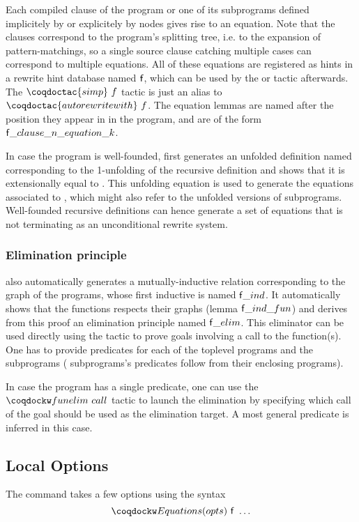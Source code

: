 Each compiled clause of the program or one
of its subprograms defined implicitely by  or explicitely by
 nodes gives rise to an equation. Note that the clauses
correspond to the program's splitting tree, i.e. to the expansion of
pattern-matchings, so a single source clause catching multiple cases
can correspond to multiple equations. All of these equations are
registered as hints in a rewrite hint database named $\mbox{\textsf{f}}$, which can be
used by the  or  tactic
afterwards. The $\coqdoctac{simp}~f$ tactic is just an alias to
$\coqdoctac{autorewrite with}~f$. The equation lemmas are named
after the position they appear in in the program, and are of the
form $\mbox{\textsf{f}}\_clause\_n\_equation\_k$.

In case the program is well-founded, \Equations first generates an
unfolded definition named  corresponding to the
1-unfolding of the recursive definition and shows that it is
extensionally equal to . This unfolding equation is used
to generate the equations associated to , which might also
refer to the unfolded versions of subprograms. Well-founded
recursive definitions can hence generate a set of equations that
is not terminating as an unconditional rewrite system.

\subsubsection{Elimination principle}

\Equations also automatically generates a mutually-inductive relation
corresponding to the graph of the programs, whose first inductive is named
$\mbox{\textsf{f}}\_ind$. It automatically shows that the functions respects their
graphs (lemma $\mbox{\textsf{f}}\_ind\_fun$) and derives from this proof an
elimination principle named $\mbox{\textsf{f}}\_elim$. This eliminator can be used
directly using the  tactic to prove goals involving a call to
the function(s). One has to provide predicates for each of the toplevel
programs and the  subprograms ( subprograms's
predicates follow from their enclosing programs).

In case the program has a single predicate, one can use the
$\tac{funelim}~call$ tactic to launch the elimination by specifying
which call of the goal should be used as the elimination target.
A most general predicate is inferred in this case.

\subsection{Local Options}
The  command takes a few options using the syntax
\[\kw{Equations}(opts)~\cst{f}~\ldots\]

